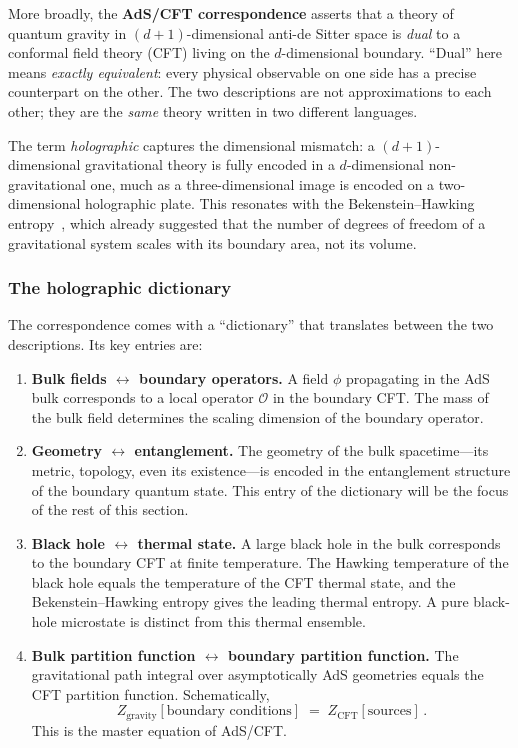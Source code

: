 \documentclass[11pt,letterpaper]{article}
\theoremstyle{plain}
\theoremstyle{definition}
\theoremstyle{remark}
\begin{document}
\noindent More broadly, the \textbf{AdS/CFT correspondence} asserts
that a theory of quantum gravity in $(d+1)$-dimensional anti-de
Sitter space is \emph{dual} to a conformal field theory (CFT) living
on the $d$-dimensional boundary.  ``Dual'' here means
\emph{exactly equivalent}: every physical observable on one side has a
precise counterpart on the other.  The two descriptions are not
approximations to each other; they are the \emph{same} theory
written in two different languages.

The term \emph{holographic} captures the dimensional mismatch: a
$(d+1)$-dimensional gravitational theory is fully encoded in a
$d$-dimensional non-gravitational one, much as a three-dimensional
image is encoded on a two-dimensional holographic plate.  This
resonates with the Bekenstein--Hawking
entropy~\citep{bekenstein1973,hawking1975}, which already suggested
that the number of degrees of freedom of a gravitational system
scales with its boundary area, not its volume.

\subsubsection*{The holographic dictionary}

The correspondence comes with a ``dictionary'' that translates between
the two descriptions.  Its key entries are:

\begin{enumerate}
\item \textbf{Bulk fields $\longleftrightarrow$ boundary operators.}
  A field $\phi$ propagating in the AdS bulk corresponds to a local
  operator $\mathcal{O}$ in the boundary CFT.  The mass of the bulk
  field determines the scaling dimension of the boundary operator.

\item \textbf{Geometry $\longleftrightarrow$ entanglement.}
  The geometry of the bulk spacetime---its metric, topology, even its
  existence---is encoded in the entanglement structure of the
  boundary quantum state.  This entry of the dictionary will be the
  focus of the rest of this section.

\item \textbf{Black hole $\longleftrightarrow$ thermal state.}  A
  large black hole in the bulk corresponds to the boundary CFT at
  finite temperature.  The Hawking temperature of the black hole
  equals the temperature of the CFT thermal state, and the
  Bekenstein--Hawking entropy gives the leading thermal entropy. A pure
  black-hole microstate is distinct from this thermal ensemble.

\item \textbf{Bulk partition function $\longleftrightarrow$ boundary
  partition function.}  The gravitational path integral over
  asymptotically AdS geometries equals the CFT partition function.
  Schematically,
  \begin{equation}
  \label{eq04:dictionary}
  Z_{\text{gravity}}[\text{boundary conditions}]
  \;=\;
  Z_{\text{CFT}}[\text{sources}]\,.
  \end{equation}
  This is the master equation of AdS/CFT.
\end{enumerate}
\end{document}
